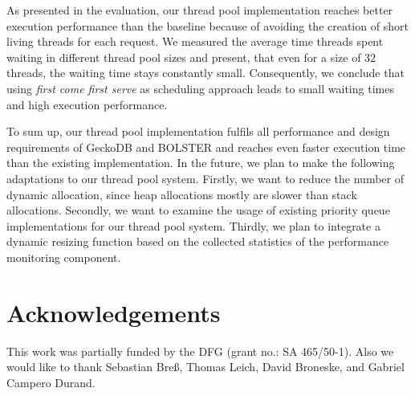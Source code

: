 \documentclass[conference]{IEEEtran}
\begin{document}
As presented in the evaluation, our thread pool implementation reaches better execution performance than the baseline because of avoiding the creation of short living threads for each request. We measured the average time threads spent waiting in different thread pool sizes and present, that even for a size of $32$ threads, the waiting time stays constantly small. Consequently, we conclude that using \emph{first come first serve} as scheduling approach leads to small waiting times and high execution performance. 

To sum up, our thread pool implementation fulfils all performance and design requirements of GeckoDB and BOLSTER and reaches even faster execution time than the existing implementation. In the future, we plan to make the following adaptations to our thread pool system. Firstly, we want to reduce the number of dynamic allocation, since heap allocations mostly are slower than stack allocations. Secondly, we want to examine the usage of existing priority queue implementations for our thread pool system. Thirdly, we plan to integrate a dynamic resizing function based on the collected statistics of the performance monitoring component. 


\section{Acknowledgements}
This work was partially funded by the DFG (grant no.: SA 465/50-1). Also we would like to thank Sebastian Bre\ss, Thomas Leich, David Broneske, and Gabriel Campero Durand.


\balance

\end{document}

